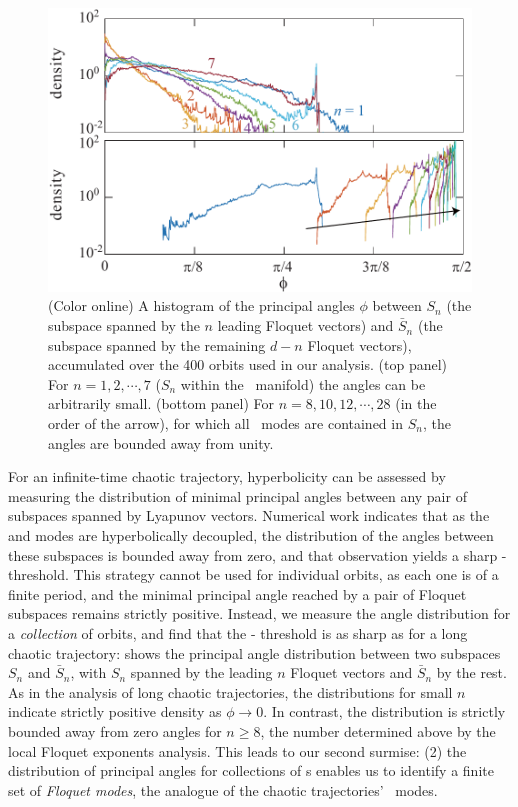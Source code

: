 \documentclass[prl,aps,preprint,showpacs,superscriptaddress]{revtex4-1} %
\begin{document}
\begin{figure}[tb]
\includegraphics[width=\hsize]{ks22vecAngles}
 \caption{
(Color online) A histogram of the principal angles $\phi$ between $S_n$
(the subspace spanned by the $n$ leading Floquet vectors) and $\bar{S}_n$
(the subspace spanned by the remaining $d-n$ Floquet vectors),
accumulated over the 400 orbits used in our analysis. (top  panel) For
$n=1,2,\cdots,7$ ($S_n$ within the \entangled\ manifold) the angles can be
arbitrarily small. (bottom panel)
For $n=8,10,12,\cdots,28$ (in the order of the arrow),
for which all \entangled\ modes are contained in $S_n$,
 the angles are bounded away from unity.
 }
 \label{fig:ks22vecAngles}
\end{figure}

For an infinite-time chaotic trajectory, hyperbolicity can be assessed by
measuring the distribution of minimal principal
angles between any pair of subspaces spanned by
Lyapunov vectors. Numerical
work indicates that as the {\entangled} and {\transient} modes are
hyperbolically decoupled, the distribution of the angles between these
subspaces is bounded away from zero, and that observation yields a sharp
{\entangled}-{\transient} threshold.
This strategy cannot be used for individual orbits, as each one is of a
finite period, and the minimal principal angle reached by a pair of
Floquet subspaces remains strictly positive.
Instead, we measure the angle distribution for a \textit{collection} of
orbits, and find that the {\entangled}-{\transient} threshold is as sharp
as for a long chaotic trajectory:  shows the principal angle
distribution between two subspaces $S_n$ and $\bar{S}_n$, with $S_n$
spanned by the leading $n$ Floquet vectors and $\bar{S}_n$ by the rest.
As in the  analysis of long chaotic trajectories, the
distributions for small $n$ indicate strictly positive density as
$\phi\to0$. In contrast, the
distribution is strictly bounded away from zero angles for $n\geq 8$,
the number determined above by the local Floquet exponents analysis.
This leads to our second surmise:
(2) the distribution of principal angles for collections of \po s enables
us to identify a finite set of {\em {\entangled} Floquet modes}, the
analogue of the chaotic trajectories'  {\entangled} \cLv\ modes.
\end{document}
